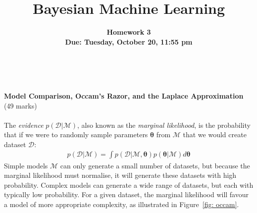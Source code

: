 \documentclass[11pt]{article}
\title{\vspace{-20mm} Bayesian Machine Learning}
\date{}
\author{
\textbf{Homework 3}  \\ \textbf{Due: Tuesday, October 20, 11:55 pm}}
\newcommand{\mbf}[1]{{\boldsymbol{\mathbf{#1}}}}
\renewcommand{\bm}{\mbf}
\begin{document}
\maketitle

\

\textbf{Model Comparison, Occam's Razor, and the Laplace Approximation} \\
(49 marks) \\ \\

The \emph{evidence} $p(\mathcal{D}|\mathcal{M})$, also known as the \emph{marginal likelihood}, is the probability that if we were to randomly sample parameters $\bm{\theta}$ from $\mathcal{M}$ that we would create dataset $\mathcal{D}$: 
\begin{align}
p(\mathcal{D} | \mathcal{M}) = \int p(\mathcal{D} | \mathcal{M}, \bm{\theta}) p(\bm{\theta} | \mathcal{M}) d\bm{\theta}
\label{eqn: evidence}
\end{align}
Simple models $\mathcal{M}$ can only generate a small number
of datasets, but because the marginal likelihood must normalise, it will generate these datasets with
high probability. Complex models can generate a wide range of datasets, but each with typically low
probability. For a given dataset, the marginal likelihood will favour a model of more appropriate
complexity, as illustrated in Figure~\ref{fig: occam}.
\end{document}
